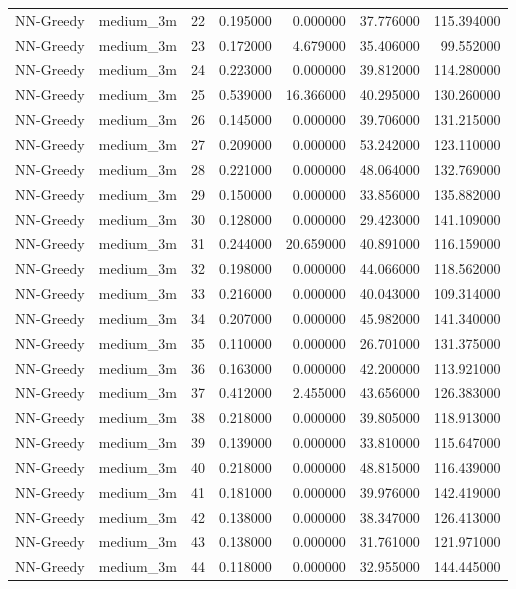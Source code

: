 \begin{tabular}{llrrrrr}
NN-Greedy & medium_3m & 22 & 0.195000 & 0.000000 & 37.776000 & 115.394000 \\
NN-Greedy & medium_3m & 23 & 0.172000 & 4.679000 & 35.406000 & 99.552000 \\
NN-Greedy & medium_3m & 24 & 0.223000 & 0.000000 & 39.812000 & 114.280000 \\
NN-Greedy & medium_3m & 25 & 0.539000 & 16.366000 & 40.295000 & 130.260000 \\
NN-Greedy & medium_3m & 26 & 0.145000 & 0.000000 & 39.706000 & 131.215000 \\
NN-Greedy & medium_3m & 27 & 0.209000 & 0.000000 & 53.242000 & 123.110000 \\
NN-Greedy & medium_3m & 28 & 0.221000 & 0.000000 & 48.064000 & 132.769000 \\
NN-Greedy & medium_3m & 29 & 0.150000 & 0.000000 & 33.856000 & 135.882000 \\
NN-Greedy & medium_3m & 30 & 0.128000 & 0.000000 & 29.423000 & 141.109000 \\
NN-Greedy & medium_3m & 31 & 0.244000 & 20.659000 & 40.891000 & 116.159000 \\
NN-Greedy & medium_3m & 32 & 0.198000 & 0.000000 & 44.066000 & 118.562000 \\
NN-Greedy & medium_3m & 33 & 0.216000 & 0.000000 & 40.043000 & 109.314000 \\
NN-Greedy & medium_3m & 34 & 0.207000 & 0.000000 & 45.982000 & 141.340000 \\
NN-Greedy & medium_3m & 35 & 0.110000 & 0.000000 & 26.701000 & 131.375000 \\
NN-Greedy & medium_3m & 36 & 0.163000 & 0.000000 & 42.200000 & 113.921000 \\
NN-Greedy & medium_3m & 37 & 0.412000 & 2.455000 & 43.656000 & 126.383000 \\
NN-Greedy & medium_3m & 38 & 0.218000 & 0.000000 & 39.805000 & 118.913000 \\
NN-Greedy & medium_3m & 39 & 0.139000 & 0.000000 & 33.810000 & 115.647000 \\
NN-Greedy & medium_3m & 40 & 0.218000 & 0.000000 & 48.815000 & 116.439000 \\
NN-Greedy & medium_3m & 41 & 0.181000 & 0.000000 & 39.976000 & 142.419000 \\
NN-Greedy & medium_3m & 42 & 0.138000 & 0.000000 & 38.347000 & 126.413000 \\
NN-Greedy & medium_3m & 43 & 0.138000 & 0.000000 & 31.761000 & 121.971000 \\
NN-Greedy & medium_3m & 44 & 0.118000 & 0.000000 & 32.955000 & 144.445000 \\

\end{tabular}

